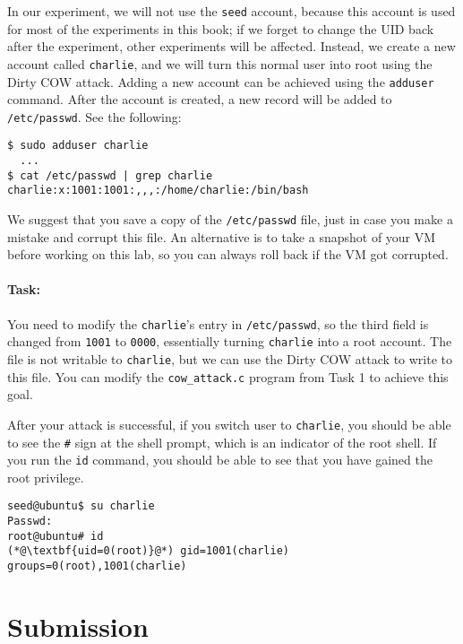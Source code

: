 In our experiment, we will not use the \texttt{seed} account, because this account is used
for most of the experiments in this book; if we forget to change the UID back after the
experiment, other experiments will be affected.  Instead, we create a new account called
\texttt{charlie}, and we will turn this normal user into root using
the Dirty COW attack.
Adding a new account can be achieved using the \texttt{adduser} command.
After the account is created, a new
record will be added to \texttt{/etc/passwd}.  See
the following:

\begin{lstlisting}
$ sudo adduser charlie
  ...
$ cat /etc/passwd | grep charlie
charlie:x:1001:1001:,,,:/home/charlie:/bin/bash
\end{lstlisting}

We suggest that you save a copy of the \texttt{/etc/passwd} file, just in case you 
make a mistake and corrupt this file. An alternative is to take a snapshot of your VM before
working on this lab, so you can always roll back if the VM got corrupted. 



\paragraph{Task:} You need to modify the \texttt{charlie}'s entry in
\texttt{/etc/passwd}, so the third field is changed from \texttt{1001} to 
\texttt{0000}, essentially turning \texttt{charlie} into a root account. 
The file is not writable to \texttt{charlie}, but we can use 
the Dirty COW attack to write to this file. You can  
modify the \texttt{cow\_attack.c} program from Task 1 to achieve 
this goal. 

After your attack is successful, if you switch user to \texttt{charlie}, you should be able to see the 
\texttt{\#} sign at the shell prompt, which is an indicator of the root shell. If you 
run the \texttt{id} command, you should be able to see that you have gained the root privilege. 

\begin{lstlisting}
seed@ubuntu$ su charlie
Passwd: 
root@ubuntu# id
(*@\textbf{uid=0(root)}@*) gid=1001(charlie) groups=0(root),1001(charlie)
\end{lstlisting}
 


\section{Submission}

\seedsubmission




